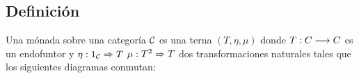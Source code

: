 \subsection{Definición}
\begin{definition}
  Una mónada sobre una categoría $\mathcal{C}$
  es una terna $(T, \eta, \mu)$ donde $T : C\longrightarrow C$ es un
  endofuntor y $\eta : 1_{\mathcal{C}}\Rightarrow T$ $\mu: T^2\Rightarrow T$ dos
  transformaciones naturales tales que los siguientes diagramas
  conmutan:


  \begin{center}

  \end{center}


\end{definition}
